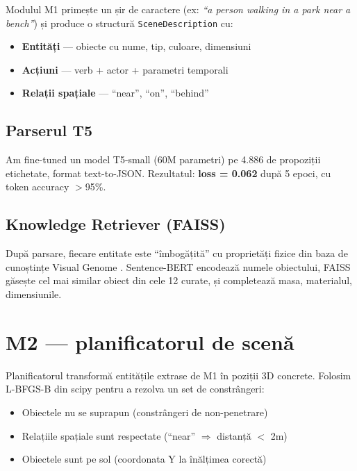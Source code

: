 Modulul M1 primește un șir de caractere (ex: \textit{``a person walking in a park near a bench''}) și produce o structură \texttt{SceneDescription} cu:

\begin{itemize}
    \item \textbf{Entități} --- obiecte cu nume, tip, culoare, dimensiuni
    \item \textbf{Acțiuni} --- verb + actor + parametri temporali
    \item \textbf{Relații spațiale} --- ``near'', ``on'', ``behind''
\end{itemize}

\subsection{Parserul T5}

Am fine-tuned un model T5-small \cite{raffel2020t5} (60M parametri) pe 4.886 de propoziții etichetate, format text-to-JSON.  Rezultatul: \textbf{loss = 0.062} după 5 epoci, cu token accuracy $>$95\%.

\subsection{Knowledge Retriever (FAISS)}

După parsare, fiecare entitate este ``îmbogățită'' cu proprietăți fizice din baza de cunoștințe Visual Genome \cite{krishna2017visualgenome}.  Sentence-BERT \cite{reimers2019sentencebert} encodează numele obiectului, FAISS \cite{johnson2021faiss} găsește cel mai similar obiect din cele 12 curate, și completează masa, materialul, dimensiunile.

\section{M2 --- planificatorul de scenă}

Planificatorul transformă entitățile extrase de M1 în poziții 3D concrete.  Folosim L-BFGS-B din scipy pentru a rezolva un set de constrângeri:

\begin{itemize}
    \item Obiectele nu se suprapun (constrângeri de non-penetrare)
    \item Relațiile spațiale sunt respectate (``near'' $\Rightarrow$ distanță $<$ 2m)
    \item Obiectele sunt pe sol (coordonata Y la înălțimea corectă)
\end{itemize}

